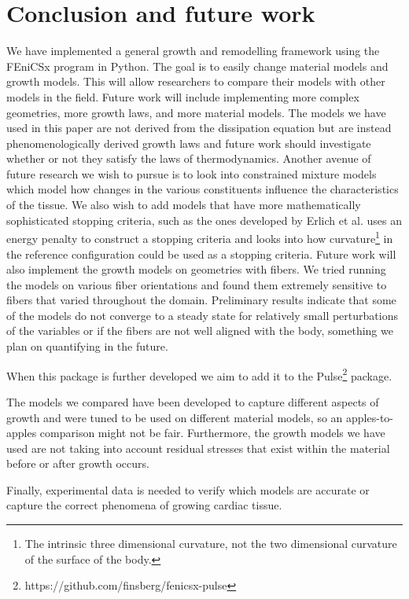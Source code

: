 \section{Conclusion and future work}
We have implemented a general growth and remodelling framework using the FEniCSx program in Python. The goal is to easily change material models and growth models. This will allow researchers to compare their models with other models in the field. Future work will include implementing more complex geometries, more growth laws, and more material models. The models we have used in this paper are not derived from the dissipation equation but are instead phenomenologically derived growth laws and future work should investigate whether or not they satisfy the laws of thermodynamics. Another avenue of future research we wish to pursue is to look into constrained mixture models which model how changes in the various constituents influence the characteristics of the tissue. We also wish to add models that have more mathematically sophisticated stopping criteria, such as the ones developed by Erlich et al. \citep{Erlich2023} uses an energy penalty to construct a stopping criteria and \citep{Erlich2024} looks into how curvature\footnote{The intrinsic three dimensional curvature, not the two dimensional curvature of the surface of the body.} in the reference configuration could be used as a stopping criteria. Future work will also implement the growth models on geometries with fibers. We tried running the models on various fiber orientations and found them extremely sensitive to fibers that varied throughout the domain. Preliminary results indicate that some of the models do not converge to a steady state for relatively small perturbations of the variables or if the fibers are not well aligned with the body, something we plan on quantifying in the future. \par
When this package is further developed we aim to add it to the Pulse\footnote{https://github.com/finsberg/fenicsx-pulse} package. \par
The models we compared have been developed to capture different aspects of growth and were tuned to be used on different material models, so an apples-to-apples comparison might not be fair. Furthermore, the growth models we have used are not taking into account residual stresses that exist within the material before or after growth occurs. \par
Finally, experimental data is needed to verify which models are accurate or capture the correct phenomena of growing cardiac tissue.


% 
